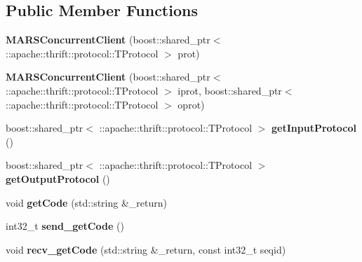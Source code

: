 \subsection*{Public Member Functions}
\begin{DoxyCompactItemize}
\item 
\mbox{\label{classMARS_1_1MARSConcurrentClient_a44e5432242b4a5aa4f8df5095ad31237}} 
{\bfseries M\+A\+R\+S\+Concurrent\+Client} (boost\+::shared\+\_\+ptr$<$ \+::apache\+::thrift\+::protocol\+::\+T\+Protocol $>$ prot)
\item 
\mbox{\label{classMARS_1_1MARSConcurrentClient_a03239381b801cca92980ba68830779a4}} 
{\bfseries M\+A\+R\+S\+Concurrent\+Client} (boost\+::shared\+\_\+ptr$<$ \+::apache\+::thrift\+::protocol\+::\+T\+Protocol $>$ iprot, boost\+::shared\+\_\+ptr$<$ \+::apache\+::thrift\+::protocol\+::\+T\+Protocol $>$ oprot)
\item 
\mbox{\label{classMARS_1_1MARSConcurrentClient_ad5920bf681a05c34c72b8844ae42cc23}} 
boost\+::shared\+\_\+ptr$<$ \+::apache\+::thrift\+::protocol\+::\+T\+Protocol $>$ {\bfseries get\+Input\+Protocol} ()
\item 
\mbox{\label{classMARS_1_1MARSConcurrentClient_ae1a10971d664f7e69f9b08147426f18a}} 
boost\+::shared\+\_\+ptr$<$ \+::apache\+::thrift\+::protocol\+::\+T\+Protocol $>$ {\bfseries get\+Output\+Protocol} ()
\item 
\mbox{\label{classMARS_1_1MARSConcurrentClient_a2791f9e0f7f4fbcf47805d7814fb58b3}} 
void {\bfseries get\+Code} (std\+::string \&\+\_\+return)
\item 
\mbox{\label{classMARS_1_1MARSConcurrentClient_a4d92e8b570eedfd91e0c002a800bbf4f}} 
int32\+\_\+t {\bfseries send\+\_\+get\+Code} ()
\item 
\mbox{\label{classMARS_1_1MARSConcurrentClient_a7b99d43fe1efc59bbe811efe1074902e}} 
void {\bfseries recv\+\_\+get\+Code} (std\+::string \&\+\_\+return, const int32\+\_\+t seqid)
\item 
\mbox{\label{classMARS_1_1MARSConcurrentClient_a8bf493c19377e69e01fc94b40b758184}} 

\end{DoxyCompactItemize}
